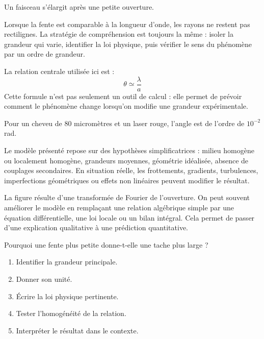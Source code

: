 \documentclass[11pt,a4paper]{article}
\begin{document}
\begin{exemplebox}
Un faisceau s'élargit après une petite ouverture.
\end{exemplebox}

\begin{methodebox}
Lorsque la fente est comparable à la longueur d'onde, les rayons ne restent pas rectilignes.
La stratégie de compréhension est toujours la même : isoler la grandeur qui varie, identifier la loi physique, puis vérifier le sens du phénomène par un ordre de grandeur.
\end{methodebox}

\begin{theorembox}
La relation centrale utilisée ici est :
\[
\theta\simeq\frac{\lambda}{a}
\]
Cette formule n'est pas seulement un outil de calcul : elle permet de prévoir comment le phénomène change lorsqu'on modifie une grandeur expérimentale.
\end{theorembox}

\begin{odgbox}
Pour un cheveu de 80 micromètres et un laser rouge, l'angle est de l'ordre de $10^{-2}$ rad.
\end{odgbox}

\begin{attentionbox}
Le modèle présenté repose sur des hypothèses simplificatrices : milieu homogène ou localement homogène, grandeurs moyennes, géométrie idéalisée, absence de couplages secondaires. En situation réelle, les frottements, gradients, turbulences, imperfections géométriques ou effets non linéaires peuvent modifier le résultat.
\end{attentionbox}

\begin{approfondissementbox}
La figure résulte d'une transformée de Fourier de l'ouverture.
On peut souvent améliorer le modèle en remplaçant une relation algébrique simple par une équation différentielle, une loi locale ou un bilan intégral. Cela permet de passer d'une explication qualitative à une prédiction quantitative.
\end{approfondissementbox}

\begin{exercicebox}
Pourquoi une fente plus petite donne-t-elle une tache plus large ?
\begin{enumerate}
  \item Identifier la grandeur principale.
  \item Donner son unité.
  \item Écrire la loi physique pertinente.
  \item Tester l'homogénéité de la relation.
  \item Interpréter le résultat dans le contexte.
\end{enumerate}
\end{exercicebox}
\end{document}
